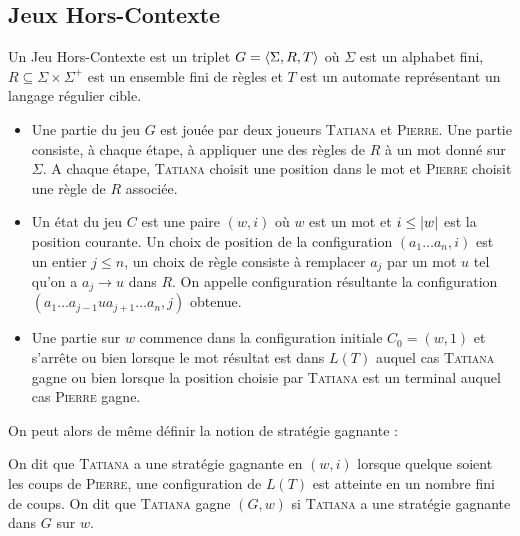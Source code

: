\documentclass{cours}
\begin{document}
\subsection{Jeux Hors-Contexte}
\begin{definition}
    Un Jeu Hors-Contexte est un triplet $G = \left\langle \Sigma, R, T \right\rangle$ où $\Sigma$ est un alphabet fini, $R \subseteq \Sigma \times \Sigma^{+}$ est un ensemble fini de règles et $T$ est un automate représentant un langage régulier cible.
    \begin{itemize}
        \item Une partie du jeu $G$ est jouée par deux joueurs \textsc{Tatiana} et \textsc{Pierre}. Une partie consiste, à chaque étape, à appliquer une des règles de $R$ à un mot donné sur $\Sigma$. A chaque étape, \textsc{Tatiana} choisit une position dans le mot et \textsc{Pierre} choisit une règle de $R$ associée.
        \item Un état du jeu $C$ est une paire $(w, i)$ où $w$ est un mot et $i \leq \left|w\right|$ est la position courante. Un choix de position de la configuration $(a_{1}\ldots a_{n}, i)$ est un entier $j \leq n$, un choix de règle consiste à remplacer $a_{j}$ par un mot $u$ tel qu'on a $a_{j} \rightarrow u$ dans $R$. On appelle configuration résultante la configuration $\left(a_{1}\ldots a_{j-1}ua_{j+1}\ldots a_{n}, j\right)$ obtenue. 
        \item Une partie sur $w$ commence dans la configuration initiale $C_{0} = \left(w, 1\right)$ et s'arrête ou bien lorsque le mot résultat est dans $L(T)$ auquel cas \textsc{Tatiana} gagne ou bien lorsque la position choisie par \textsc{Tatiana} est un terminal auquel cas \textsc{Pierre} gagne.
    \end{itemize} 
\end{definition}

On peut alors de même définir la notion de stratégie gagnante : 
\begin{definition}
    On dit que \textsc{Tatiana} a une stratégie gagnante en $\left(w, i\right)$ lorsque quelque soient les coups de \textsc{Pierre}, une configuration de $L(T)$ est atteinte en un nombre fini de coups. On dit que \textsc{Tatiana} gagne $\left(G, w\right)$ si \textsc{Tatiana} a une stratégie gagnante dans $G$ sur $w$. 
\end{definition}
\end{document}
